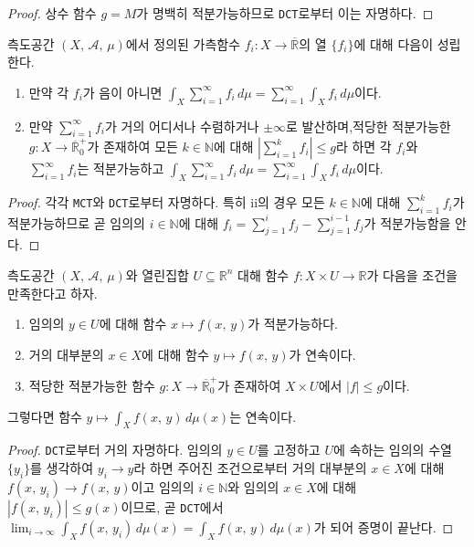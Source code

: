 \begin{proof}
    상수 함수 $g=M$가 명백히 적분가능하므로 \texttt{DCT}로부터 이는 자명하다.
\end{proof}

\begin{corollary}
    측도공간 $(X,\,\mathcal{A},\,\mu)$에서 정의된 가측함수 $f_i:X\to\overline{\mathbb{R}}$의 열 $\{f_i\}$에 대해 다음이 성립한다.
    \begin{enumerate}
        \item 만약 각 $f_i$가 음이 아니면 $\int_X\sum_{i=1}^\infty f_i\,d\mu=\sum_{i=1}^\infty\int_Xf_i\,d\mu$이다.
        \item 만약 $\sum_{i=1}^\infty f_i$가 거의 어디서나 수렴하거나 $\pm\infty$로 발산하며,\footnotemark 적당한 적분가능한 $g:X\to\overline{\mathbb{R}}^+_0$가 존재하여 모든 $k\in\mathbb{N}$에 대해 $|\sum_{i=1}^kf_i|\leq g$라 하면 각 $f_i$와 $\sum_{i=1}^\infty f_i$는 적분가능하고 $\int_X\sum_{i=1}^\infty f_i\,d\mu=\sum_{i=1}^\infty\int_Xf_i\,d\mu$이다.
    \end{enumerate}
\end{corollary}

\begin{proof}
    각각 \texttt{MCT}와 \texttt{DCT}로부터 자명하다. 특히 ii의 경우 모든 $k\in\mathbb{N}$에 대해 $\sum_{i=1}^kf_i$가 적분가능하므로 곧 임의의 $i\in\mathbb{N}$에 대해 $f_i=\sum_{j=1}^if_j-\sum_{j=1}^{i-1}f_j$가 적분가능함을 안다.
\end{proof}

\begin{corollary}\label{cor:integralDerivative}
    측도공간 $(X,\,\mathcal{A},\,\mu)$와 열린집합 $U\subseteq\mathbb{R}^n$ 대해 함수 $f:X\times U\to\mathbb{R}$가 다음을 조건을 만족한다고 하자.
    \begin{enumerate}
        \item 임의의 $y\in U$에 대해 함수 $x\mapsto f(x,\,y)$가 적분가능하다.
        \item 거의 대부분의 $x\in X$에 대해 함수 $y\mapsto f(x,\,y)$가 연속이다.
        \item 적당한 적분가능한 함수 $g:X\to\overline{\mathbb{R}}^+_0$가 존재하여 $X\times U$에서 $|f|\leq g$이다.
    \end{enumerate}
    그렇다면 함수 $y\mapsto\int_Xf(x,\,y)\,d\mu(x)$는 연속이다.
\end{corollary}

\begin{proof}
    \texttt{DCT}로부터 거의 자명하다. 임의의 $y\in U$를 고정하고 $U$에 속하는 임의의 수열 $\{y_i\}$를 생각하여 $y_i\to y$라 하면 주어진 조건으로부터 거의 대부분의 $x\in X$에 대해 $f(x,\,y_i)\to f(x,\,y)$이고 임의의 $i\in\mathbb{N}$와 임의의 $x\in X$에 대해 $|f(x,\,y_i)|\leq g(x)$이므로, 곧 \texttt{DCT}에서 $\lim_{i\to\infty}\int_Xf(x,\,y_i)\,d\mu(x)=\int_Xf(x,\,y)\,d\mu(x)$가 되어 증명이 끝난다.
\end{proof}

